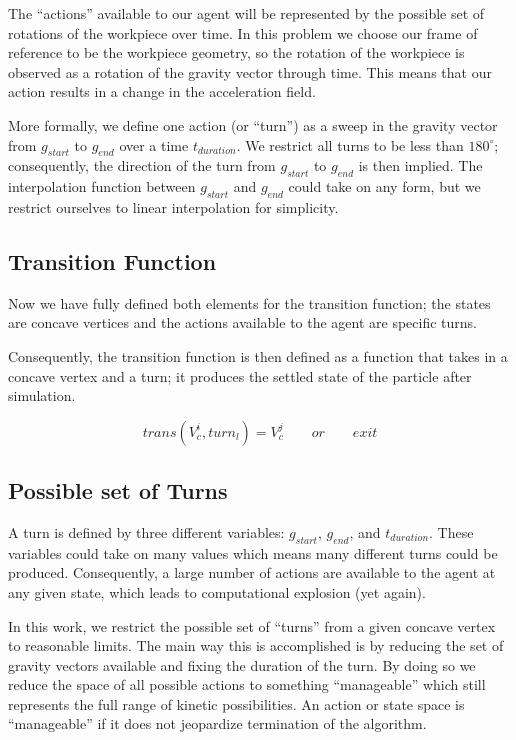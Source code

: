 The ``actions'' available to our agent will be represented by the possible set of rotations of the workpiece over time. In this problem we choose our frame of reference to be the workpiece geometry, so the rotation of the workpiece is observed as a rotation of the gravity vector through time. This means that our action results in a change in the acceleration field.

More formally, we define one action (or ``turn'') as a sweep in the gravity vector from $g_{start}$ to $g_{end}$ over a time $t_{duration}$. We restrict all turns to be less than $180^{\circ}$; consequently, the direction of the turn from $g_{start}$ to $g_{end}$ is then implied. The interpolation function between $g_{start}$ and $g_{end}$ could take on any form, but we restrict ourselves to linear interpolation for simplicity.

	\subsection{Transition Function}

Now we have fully defined both elements for the transition function; the states are concave vertices and the actions available to the agent are specific turns.

Consequently, the transition function is then defined as a function that takes in a concave vertex and a turn; it produces the settled state of the particle after simulation.

$$
trans(V_{c}^{i}, turn_{l}) = V_{c}^j \qquad or \qquad exit
$$

	\subsection{Possible set of Turns}

A turn is defined by three different variables: $g_{start}$, $g_{end}$, and $t_{duration}$. These variables could take on many values which means many different turns could be produced. Consequently, a large number of actions are available to the agent at any given state, which leads to computational explosion (yet again).


In this work, we restrict the possible set of ``turns'' from a given concave vertex to reasonable limits. The main way this is accomplished is by reducing the set of gravity vectors available and fixing the duration of the turn. By doing so we reduce the space of all possible actions to something ``manageable'' which still represents the full range of kinetic possibilities. An action or state space is ``manageable'' if it does not jeopardize termination of the algorithm.


